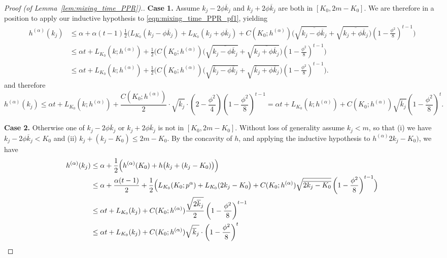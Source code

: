 \documentclass{article}
\newcommand{\1}{\mathbf{1}}
\theoremstyle{definition}
\theoremstyle{remark}
\begin{document}
\begin{proof}[Proof (of Lemma~\ref{lem:mixing_time_PPR}).]
	\textbf{Case 1.}
	Assume $k_j - 2 \phi \overline{k}_j$ and $k_j + 2 \phi \overline{k}_j$ are both in $[K_0,2m  - K_0]$. We are therefore in a position to apply our inductive hypothesis to \eqref{eqn:mixing_time_PPR_pf1}, yielding
	\begin{align*}
	h^{(\alpha)}(k_j) & \leq \alpha + \alpha(t-1) \frac{1}{2}\biggl(L_{K_0}(k_j - \phi \overline{k}_j) + L_{K_0}(k_j + \phi \overline{k}_j) + C(K_0;h^{(\alpha)})\bigl(\sqrt{\overline{k_j - \phi \overline{k}_j}} + \sqrt{\overline{k_j + \phi \overline{k}_j}}\bigr)\left(1 - \frac{\phi^2}{8}\right)^{t-1} \biggr) \\
	& \leq \alpha t + L_{K_0}(k;h^{(\alpha)}) + \frac{1}{2}\biggl(C(K_0;h^{(\alpha)})\bigl(\sqrt{\overline{k_j - \phi \overline{k}_j}} + \sqrt{\overline{k_j + \phi \overline{k}_j}}\bigr)\left(1 - \frac{\phi^2}{8}\right)^{t-1} \biggr) \\
	& \leq \alpha t + L_{K_0}(k;h^{(\alpha)}) + \frac{1}{2}\biggl(C(K_0;h^{(\alpha)})\bigl(\sqrt{\overline{k}_j - \phi \overline{k}_j} + \sqrt{\overline{k}_j + \phi \overline{k}_j}\bigr)\left(1 - \frac{\phi^2}{8}\right)^{t-1} \biggr).
	\end{align*}
	and therefore
	\begin{equation*}
	h^{(\alpha)}(k_j) \leq  \alpha t + L_{K_0}(k;h^{(\alpha)}) + \frac{C(K_0;h^{(\alpha)})}{2}\cdot \sqrt{\overline{k}_j}\cdot\left(2 - \frac{\phi^2}{4}\right)\left(1 - \frac{\phi^2}{8}\right)^{t-1} = \alpha t + L_{K_0}(k;h^{(\alpha)}) + C(K_0;h^{(\alpha)})\sqrt{\overline{k}_j}\left(1 - \frac{\phi^2}{8}\right)^{t}.
	\end{equation*}
	
	\textbf{Case 2.} Otherwise one of $k_j - 2 \phi \overline{k}_j$ or $k_j + 2 \phi \overline{k}_j$ is not in $[K_0,2m  - K_0]$. Without loss of generality assume $k_j < m$, so that (i) we have $k_j - 2 \phi \overline{k}_j < K_0$ and (ii) $k_j + (k_j - K_0) \leq 2m - K_0$. By the concavity of $h$, and applying the inductive hypothesis to $h^{(\alpha)}2k_j - K_0)$, we have
	\begin{align*}
	h^{(\alpha)}(k_j) & \leq \alpha + \frac{1}{2}\Bigl(h^{(\alpha)}(K_0) + h\bigl(k_j + (k_j - K_0)\bigr)\Bigr) \\
	& \leq\alpha + \frac{\alpha(t - 1)}{2} + \frac{1}{2}\Bigl(L_{K_0}(K_0;p^{\alpha}) + L_{K_0}(2k_j - K_0\bigr) + C(K_0;h^{(\alpha)})\sqrt{\overline{2k_j - K_0}}\left(1 - \frac{\phi^2}{8}\right)^{t - 1}\Bigr) \\
	& \leq \alpha t + L_{K_0}(k_j) + C(K_0;h^{(\alpha)}) \frac{\sqrt{2\overline{k}_j}}{2} \left(1 - \frac{\phi^2}{8}\right)^{t - 1} \\
	& \leq \alpha t + L_{K_0}(k_j) + C(K_0;h^{(\alpha)}) \sqrt{\overline{k}_j} \cdot \left(1 - \frac{\phi^2}{8}\right)^{t}
	\end{align*}
\end{proof}
\end{document}
